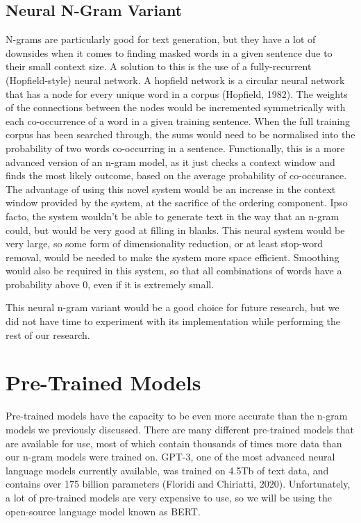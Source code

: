 \documentclass{article}
\begin{document}
\subsection{Neural N-Gram Variant}
N-grams are particularly good for text generation, but they have a lot of downsides when it comes to finding masked words in a given sentence due to their small context size. A solution to this is the use of a fully-recurrent (Hopfield-style) neural network. A hopfield network is a circular neural network that has a node for every unique word in a corpus (Hopfield, 1982). The weights of the connections between the nodes would be incremented symmetrically with each co-occurrence of a word in a given training sentence. When the full training corpus has been searched through, the sums would need to be normalised into the probability of two words co-occurring in a sentence. Functionally, this is a more advanced version of an n-gram model, as it just checks a context window and finds the most likely outcome, based on the average probability of co-occurance. The advantage of using this novel system would be an increase in the context window provided by the system, at the sacrifice of the ordering component. Ipso facto, the system wouldn't be able to generate text in the way that an n-gram could, but would be very good at filling in blanks. This neural system would be very large, so some form of dimensionality reduction, or at least stop-word removal, would be needed to make the system more space efficient. Smoothing would also be required in this system, so that all combinations of words have a probability above 0, even if it is extremely small.

This neural n-gram variant would be a good choice for future research, but we did not have time to experiment with its implementation while performing the rest of our research.

\section{Pre-Trained Models}
Pre-trained models have the capacity to be even more accurate than the n-gram models we previously discussed. There are many different pre-trained models that are available for use, most of which contain thousands of times more data than our n-gram models were trained on. GPT-3, one of the most advanced neural language models currently available, was trained on 4.5Tb of text data, and contains over 175 billion parameters (Floridi and Chiriatti, 2020). Unfortunately, a lot of pre-trained models are very expensive to use, so we will be using the open-source language model known as BERT.
\end{document}
